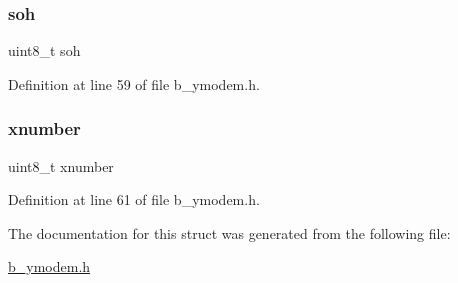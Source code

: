 \mbox{\label{structb_ymodem128_info__t_a87bdcb2d9de9c3eef834e0af26f2d5e3}} 
\subsubsection{\texorpdfstring{soh}{soh}}
{\footnotesize\ttfamily uint8\+\_\+t soh}



Definition at line 59 of file b\+\_\+ymodem.\+h.

\mbox{\label{structb_ymodem128_info__t_ae817be61f4d69f01a76ff417b23f5a54}} 
\subsubsection{\texorpdfstring{xnumber}{xnumber}}
{\footnotesize\ttfamily uint8\+\_\+t xnumber}



Definition at line 61 of file b\+\_\+ymodem.\+h.



The documentation for this struct was generated from the following file\+:\begin{DoxyCompactItemize}
\item 
\mbox{\hyperlink{b__ymodem_8h}{b\+\_\+ymodem.\+h}}\end{DoxyCompactItemize}
